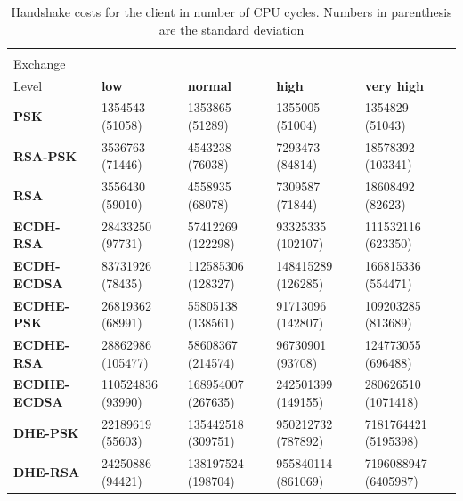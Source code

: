   \begin{table}[]
	\begin{tabular}{|l|l|l|l|l|}
	\hline
	 \backslashbox{Key\\Exchange}{Security\\Level}                     & \textbf{low}      & \textbf{normal}    & \textbf{high}      & \textbf{very high}   \\ \hline
	\textbf{PSK}         & 1354543 (51058)   & 1353865 (51289)    & 1355005 (51004)    & 1354829 (51043)      \\ \hline
	\textbf{RSA-PSK}     & 3536763 (71446)   & 4543238 (76038)    & 7293473 (84814)    & 18578392 (103341)    \\ \hline
	\textbf{RSA}         & 3556430 (59010)   & 4558935 (68078)    & 7309587 (71844)    & 18608492 (82623)     \\ \hline
	\textbf{ECDH-RSA}    & 28433250 (97731)  & 57412269 (122298)  & 93325335 (102107)  & 111532116 (623350)   \\ \hline
	\textbf{ECDH-ECDSA}  & 83731926 (78435)  & 112585306 (128327) & 148415289 (126285) & 166815336 (554471)   \\ \hline
	\textbf{ECDHE-PSK}   & 26819362 (68991)  & 55805138 (138561)  & 91713096 (142807)  & 109203285 (813689)   \\ \hline
	\textbf{ECDHE-RSA}   & 28862986 (105477) & 58608367 (214574)  & 96730901 (93708)   & 124773055 (696488)   \\ \hline
	\textbf{ECDHE-ECDSA} & 110524836 (93990) & 168954007 (267635) & 242501399 (149155) & 280626510 (1071418)  \\ \hline
	\textbf{DHE-PSK}     & 22189619 (55603)  & 135442518 (309751) & 950212732 (787892) & 7181764421 (5195398) \\ \hline
	\textbf{DHE-RSA}     & 24250886 (94421)  & 138197524 (198704) & 955840114 (861069) & 7196088947 (6405987) \\ \hline
	\end{tabular}
	\centering \caption{\label{table:client-hs-cost-all-sls} Handshake costs for the client in number of CPU cycles. Numbers in parenthesis are the standard deviation}
	\end{table}
  
